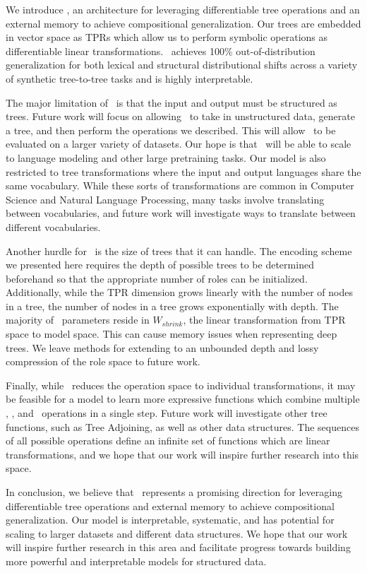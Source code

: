 We introduce \blackboard, an architecture for leveraging differentiable tree operations and an external memory to achieve compositional generalization. Our trees are embedded in vector space as TPRs which allow us to perform symbolic operations as differentiable linear transformations. \blackboard\ achieves 100\% out-of-distribution generalization for both lexical and structural distributional shifts across a variety of synthetic tree-to-tree tasks and is highly interpretable.

The major limitation of \blackboard\ is that the input and output must be structured as trees. Future work will focus on allowing \blackboard\ to take in unstructured data, generate a tree, and then perform the operations we described. This will allow \blackboard\ to be evaluated on a larger variety of datasets. Our hope is that \blackboard\ will be able to scale to language modeling and other large pretraining tasks. Our model is also restricted to tree transformations where the input and output languages share the same vocabulary. While these sorts of transformations are common in Computer Science and Natural Language Processing, many tasks involve translating between vocabularies, and future work will investigate ways to translate between different vocabularies.

Another hurdle for \blackboard\ is the size of trees that it can handle. The encoding scheme we presented here requires the depth of possible trees to be determined beforehand so that the appropriate number of roles can be initialized. Additionally, while the TPR dimension grows linearly with the number of nodes in a tree, the number of nodes in a tree grows exponentially with depth. The majority of \blackboard\ parameters reside in $W_{shrink}$, the linear transformation from TPR space to model space. This can cause memory issues when representing deep trees. We leave methods for extending to an unbounded depth and lossy compression of the role space to future work.

Finally, while \blackboard\ reduces the operation space to individual transformations, it may be feasible for a model to learn more expressive functions which combine multiple \car, \cdr, and \cons\ operations in a single step. Future work will investigate other tree functions, such as Tree Adjoining, as well as other data structures. The sequences of all possible operations define an infinite set of functions which are linear transformations, and we hope that our work will inspire further research into this space.

In conclusion, we believe that \blackboard\ represents a promising direction for leveraging differentiable tree operations and external memory to achieve compositional generalization. Our model is interpretable, systematic, and has potential for scaling to larger datasets and different data structures. We hope that our work will inspire further research in this area and facilitate progress towards building more powerful and interpretable models for structured data.